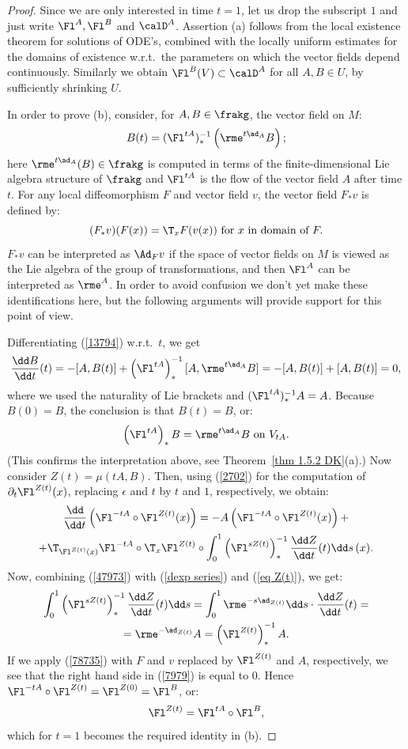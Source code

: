 \begin{proof}
    Since we are only interested in time $t=1$, let us drop the subscript $1$ and just write $\Fl^A,\Fl^B$ and $\calD^A$. Assertion (a) follows from the local existence theorem for solutions of ODE's, combined with the locally uniform estimates for the domains of existence w.r.t.\ the parameters on which the vector fields depend continuously. Similarly we obtain $\Fl^B(V)\subset \calD^A$ for all $A,B\in U$, by sufficiently shrinking $U$.

    In order to prove (b), consider, for $A,B\in\frakg$, the vector field on $M$:
    \[B(t)=(\Fl^{tA})_\ast^{-1}\left(\rme^{t\ad_A}B\right);\label{13794}\]
    here $\rme^{t\ad_A}(B)\in\frakg$ is computed in terms of the finite-dimensional Lie algebra structure of $\frakg$ and $\Fl^{tA}$ is the flow of the vector field $A$ after time $t$. For any local diffeomorphism $F$ and vector field $v$, the vector field $F_\ast v$ is defined by:
    \[(F_\ast v)(F(x))=\T_xF(v(x))\text{ for }x\text{ in domain of }F.\label{78735}\]
    $F_\ast v$ can be interpreted as $\Ad_F v$ if the space of vector fields on $M$ is viewed as the Lie algebra of the group of transformations, and then $\Fl^A$ can be interpreted as $\rme^A$. In order to avoid confusion we don't yet make these identifications here, but the following arguments will provide support for this point of view.

    Differentiating (\ref{13794}) w.r.t.\ $t$, we get
    \[\frac{\dd B}{\dd t}(t)=-[A,B(t)]+\left(\Fl^{tA}\right)_\ast^{-1}[A,\rme^{t\ad_A}B]=-[A,B(t)]+[A,B(t)]=0,\]
    where we used the naturality of Lie brackets and $(\Fl^{tA})_\ast^{-1}A=A$. Because $B(0)=B$, the conclusion is that $B(t)=B$, or:
    \[\left(\Fl^{tA}\right)_\ast B=\rme^{t\ad_A}B\text{ on }V_{tA}.\label{47973}\]
    (This confirms the interpretation above, see Theorem~\ref{thm 1.5.2 DK}(a).) Now consider $Z(t)=\mu(tA,B)$. Then, using (\ref{2702}) for the computation of $\partial_t \Fl^{Z(t)}(x)$, replacing $\epsilon$ and $t$ by $t$ and $1$, respectively, we obtain:
    \begin{multline}
        \frac{\dd}{\dd t}\left(\Fl^{-tA}\circ \Fl^{Z(t)}(x)\right)=-A\left(\Fl^{-tA}\circ \Fl^{Z(t)}(x)\right)+\\
        +\T_{\Fl^{Z(t)}(x)}\Fl^{-tA}\circ \T_x\Fl^{Z(t)}\circ\int_0^1 \left(\Fl^{sZ(t)}\right)_\ast^{-1}\frac{\dd Z}{\dd t}(t)\dd s\,(x).\label{7979}
    \end{multline}
    Now, combining (\ref{47973}) with (\ref{dexp series}) and (\ref{eq Z(t)}), we get:
    \begin{multline}
        \int_0^1\left(\Fl^{sZ(t)}\right)_\ast^{-1}\frac{\dd Z}{\dd t}(t)\dd s
        =\int_0^1 \rme^{-s\ad_{Z(t)}}\dd s \cdot \frac{\dd Z}{\dd t}(t)=\\
        =\rme^{-\ad_{Z(t)}}A=\left(\Fl^{Z(t)}\right)_\ast^{-1} A.
    \end{multline}
    If we apply (\ref{78735}) with $F$ and $v$ replaced by $\Fl^{Z(t)}$ and $A$, respectively, we see that the right hand side in (\ref{7979}) is equal to $0$. Hence $\Fl^{-tA}\circ \Fl^{Z(t)}=\Fl^{Z(0)}=\Fl^B$, or:
    \[\Fl^{Z(t)}=\Fl^{tA}\circ \Fl^B,\]
    which for $t=1$ becomes the required identity in (b).


\end{proof}
